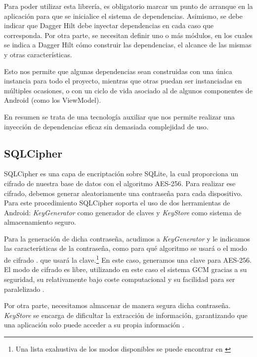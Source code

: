             Para poder utilizar esta librería, es obligatorio marcar un punto de arranque en la aplicación para que se
            inicialice el sistema de dependencias. Asimismo, se debe indicar que Dagger Hilt debe inyectar dependencias 
            en cada caso que corresponda. Por otra parte, se necesitan definir uno o más módulos, en los 
            cuales se indica a Dagger Hilt cómo construir las dependencias, el alcance de las mismas y otras
            características. 
            
            Esto nos permite que algunas dependencias sean construidas con una única instancia para
            todo el proyecto, mientras que otras puedan ser instanciadas en múltiples ocasiones, o con un ciclo de vida 
            asociado al de algunos componentes de Android (como los ViewModel).

            En resumen se trata de una tecnología auxiliar que nos permite realizar una inyección de dependencias
            eficaz sin demasiada complejidad de uso.

        \subsection{SQLCipher}
            SQLCipher es una capa de encriptación sobre SQLite, la cual proporciona un cifrado de nuestra base de datos
            con el algoritmo AES-256. Para realizar ese cifrado, debemos generar aleatoriamente una contraseña para 
            cada dispositivo. Para este procedimiento SQLCipher soporta el uso de dos herramientas de Android: 
            \textit{KeyGenerator} como generador de claves y \textit{KeyStore} como sistema de almacenamiento seguro.
            
            Para la generación de dicha contraseña, acudimos a \textit{KeyGenerator} y le indicamos las características
            de la contraseña, como para qué algoritmo se usará o el modo de cifrado .
            que usará la clave.\footnote{
                Una lista exahustiva de los modos disponibles se puede encontrar en \cite{noauthor_keyproperties_nodate}
            } 
            En este caso, generamos una clave para AES-256. El modo de cifrado es libre, utilizando en este caso el 
            sistema GCM gracias a su seguridad, su relativamente bajo coste 
            computacional y su facilidad para ser paralelizado \cite{kariyawasam_selecting_2021}.
            
            Por otra parte, necesitamos almacenar de manera segura dicha contraseña. \textit{KeyStore} se encarga de
            dificultar la extracción de información, garantizando que una aplicación solo puede acceder a su propia
            información \cite{sena_using_2019}. 

